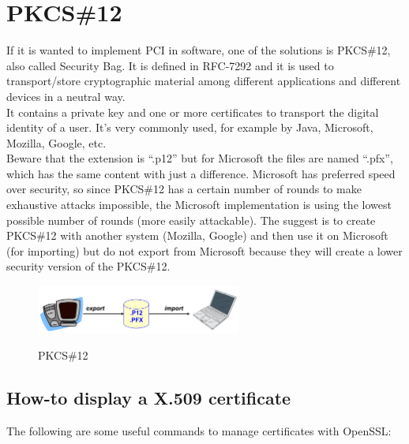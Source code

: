 \section{PKCS\#12}
If it is wanted to implement PCI in software, one of the solutions is
PKCS\#12, also called Security Bag. It is defined in RFC-7292 and it
is used to transport/store cryptographic material among different
applications and different devices in a neutral way.\\
It contains a private key and one or more certificates to transport
the digital identity of a user. It's very commonly used, for example 
by Java, Microsoft, Mozilla, Google, etc.\\ 
Beware that the extension is “.p12” but for Microsoft the files are
named “.pfx”, which has the same content with just a difference.
Microsoft has preferred speed over security, so since PKCS\#12 has a
certain number of rounds to make exhaustive attacks impossible, the
Microsoft implementation is using the lowest possible number of rounds
(more easily attackable). The suggest is to create PKCS\#12 with
another system (Mozilla, Google) and then use it on Microsoft (for
importing) but do not export from Microsoft because they will create a
lower security version of the PKCS\#12.
\begin{figure}[H]
  \centering
  \includegraphics[width=0.6\textwidth]{img/x509 pkcs12.png}
  \label{fig:PKCS12}

  \caption{PKCS\#12}
\end{figure}


\subsection{How-to display a X.509 certificate}
The following are some useful commands to manage certificates with 
OpenSSL:

